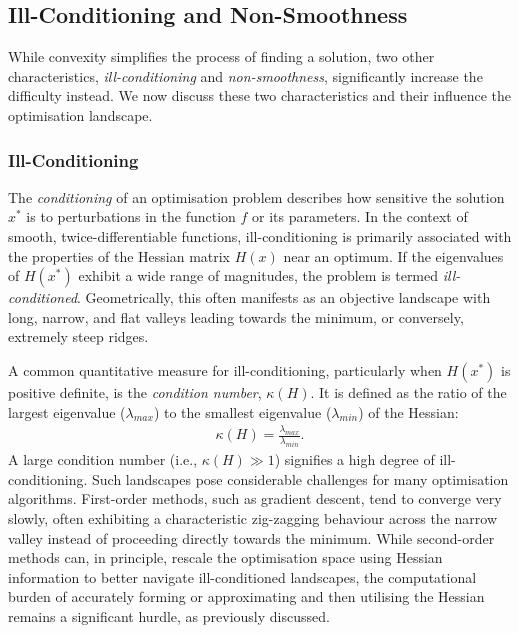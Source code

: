 \subsection{Ill-Conditioning and Non-Smoothness}
\label{ssec:ill_conditioning_nonsmooth}

While convexity simplifies the process of finding a solution, two other characteristics, \textit{ill-conditioning} and \textit{non-smoothness}, significantly increase the difficulty instead. We now discuss these two characteristics and their influence the optimisation landscape.

\subsubsection{Ill-Conditioning}
\label{sssec:ill_conditioning}

The \textit{conditioning} of an optimisation problem describes how sensitive the solution $x^*$ is to perturbations in the function $f$ or its parameters. In the context of smooth, twice-differentiable functions, ill-conditioning is primarily associated with the properties of the Hessian matrix $H(x)$ near an optimum. If the eigenvalues of $H(x^*)$ exhibit a wide range of magnitudes, the problem is termed \textit{ill-conditioned}. Geometrically, this often manifests as an objective landscape with long, narrow, and flat valleys leading towards the minimum, or conversely, extremely steep ridges.

A common quantitative measure for ill-conditioning, particularly when $H(x^*)$ is positive definite, is the \textit{condition number}, $\kappa(H)$. It is defined as the ratio of the largest eigenvalue ($\lambda_{max}$) to the smallest eigenvalue ($\lambda_{min}$) of the Hessian:
\begin{align}
    \kappa(H) = \frac{\lambda_{max}}{\lambda_{min}}.
    \label{eq:condition_number}
\end{align}
A large condition number (i.e., $\kappa(H) \gg 1$) signifies a high degree of ill-conditioning. Such landscapes pose considerable challenges for many optimisation algorithms. First-order methods, such as gradient descent, tend to converge very slowly, often exhibiting a characteristic zig-zagging behaviour across the narrow valley instead of proceeding directly towards the minimum. While second-order methods can, in principle, rescale the optimisation space using Hessian information to better navigate ill-conditioned landscapes, the computational burden of accurately forming or approximating and then utilising the Hessian remains a significant hurdle, as previously discussed.

